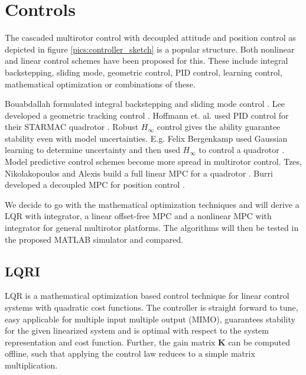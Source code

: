 \chapter{Controls}
\label{sec:controls}
The cascaded multirotor control with decoupled attitude and position control as depicted in figure \ref{pics:controller_sketch} is a popular structure. Both nonlinear and linear control schemes have been proposed for this. These include integral backstepping, sliding mode, geometric control, PID control, learning control, mathematical optimization or combinations of these.

Bouabdallah formulated integral backstepping and sliding mode control \cite{Bouabdallah2005,Bouabdallah2007}. Lee developed a geometric tracking control \cite{Lee2010}. Hoffmann et. al. used PID control for their STARMAC quadrotor \cite{Hoffmann2007}. Robust $H_\infty$ control gives the ability guarantee stability even with model uncertainties. E.g. Felix Bergenkamp used Gaussian learning to determine uncertainty and then used $H_\infty$ to control a quadrotor \cite{Berkenkamp2014,www:robustquad}. Model predictive control schemes become more spread in multirotor control. Tzes, Nikolakopoulos and Alexis build a full linear MPC for a quadrotor \cite{Tzes2012}. Burri developed a decoupled MPC for position control \cite{Burri2012}. 

We decide to go with the mathematical optimization techniques and will derive a LQR with integrator, a linear offset-free MPC and a nonlinear MPC with integrator for general multirotor platforms. The algorithms will then be tested in the proposed MATLAB simulator and compared.

\section{LQRI} 
LQR is a mathematical optimization based control technique for linear control systems with quadratic cost functions. The controller is straight forward to tune, easy applicable for multiple input multiple output (MIMO), guarantees stability for the given linearized system and is optimal with respect to the system representation and cost function. Further, the gain matrix $\mathbf{K}$ can be computed offline, such that applying the control law reduces to a simple matrix multiplication.

